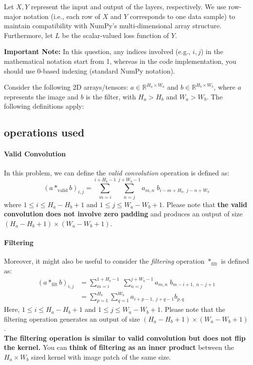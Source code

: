 \documentclass[lang=cn,11pt]{elegantbook}
\begin{document}
Let $X, Y$ represent the input and output of the layers, respectively. We use row-major notation (i.e., each row of $X$ and $Y$ corresponds to one data sample) to maintain compatibility with NumPy's multi-dimensional array structure. Furthermore, let $L$ be the scalar-valued loss function of $Y$.

\textbf{Important Note:} In this question, any indices involved (e.g., $i, j$) in the mathematical notation start from 1, whereas in the code implementation, you should use 0-based indexing (standard NumPy notation).

Consider the following 2D arrays/tensors: $a \in \mathbb{R}^{H_a \times W_a}$ and $b \in \mathbb{R}^{H_b \times W_b}$, where $a$ represents the image and $b$ is the filter, with $H_a > H_b$ and $W_a > W_b$. The following definitions apply:

\subsection*{operations used}
\paragraph*{Valid Convolution} In this problem, we can define the \textit{valid convolution} operation is defined as:
\[
(a *_{\text{valid}} b)_{i,j} =
\sum_{m=i}^{i+H_b-1} \sum_{n=j}^{j+W_b-1} a_{m,n}\; b_{i-m+H_b,\; j-n+W_b}
\]
where $1 \leq i \leq H_a - H_b + 1$ and $1 \leq j \leq W_a - W_b + 1$. Please note that \textbf{the valid convolution does not involve zero padding} and produces an output of size $(H_a - H_b + 1) \times (W_a - W_b + 1)$.


\paragraph*{Filtering} Moreover, it might also be useful to consider the \textit{filtering} operation $*_{\text{filt}}$ is defined as:
\begin{align}
    (a *_{\text{filt}} b)_{i,j} 
  &  = \sum_{m=i}^{1+H_b - 1} \; \sum_{n=j}^{j+W_b-1}   a_{m,n} \; b_{m-i+1,\; n - j +1} \\
  & =\sum_{p=1}^{H_b} \sum_{q=1}^{W_b} a_{i+p-1,\; j+q-1} b_{p,q}
\end{align}
Here, $1 \leq i \leq H_a - H_b + 1$ and $1 \leq j \leq W_a - W_b + 1$. Please note that the filtering operation generates an output of size $(H_a - H_b + 1) \times (W_a - W_b + 1)$. \\
\textbf{The filtering operation is similar to valid convolution but does not flip the kernel.} You can \textbf{think of filtering as an inner product }between the $H_a \times W_b$ sized kernel with image patch of the same size.
\end{document}
